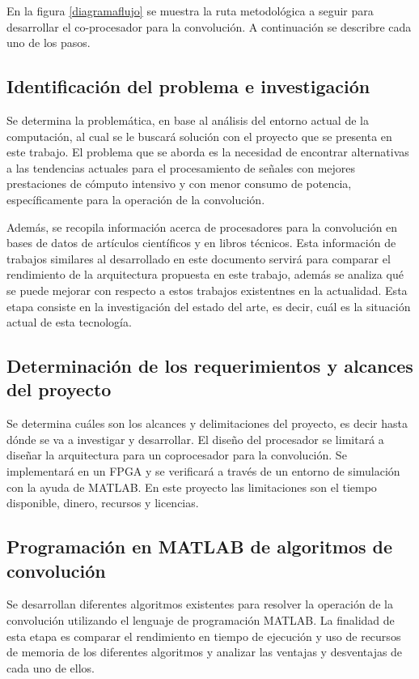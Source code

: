 \newpage
En la figura \ref{diagramaflujo} se muestra la ruta metodológica a seguir para desarrollar el co-procesador para la convolución. A continuación se describre cada uno de los pasos. 

\subsection{Identificación del problema e investigación}
Se determina la problemática, en base al análisis del entorno actual de la computación, al cual se le buscará solución con el proyecto que se presenta en este trabajo. El problema que se aborda es la necesidad de encontrar alternativas a las tendencias actuales para el procesamiento de señales con mejores prestaciones de cómputo intensivo y con menor consumo de potencia, específicamente para la operación de la convolución.

Además, se recopila información acerca de procesadores para la convolución en bases de datos de artículos científicos y en libros técnicos. Esta información de trabajos similares al desarrollado en este documento servirá para comparar el rendimiento de la arquitectura propuesta en este trabajo, además se analiza qué se puede mejorar con respecto a estos trabajos existentnes en la actualidad. Esta etapa consiste en la investigación del estado del arte, es decir, cuál es la situación actual de esta tecnología.

\subsection{Determinación de los requerimientos y alcances del proyecto}
Se determina cuáles son los alcances y delimitaciones del proyecto, es decir hasta dónde se va a investigar y desarrollar. El diseño del procesador se limitará a diseñar  la arquitectura para un coprocesador para la convolución. Se implementará en un FPGA y se verificará a través de un entorno de simulación con la ayuda de MATLAB. En este proyecto las limitaciones son el tiempo disponible, dinero, recursos y licencias.

\subsection{Programación en MATLAB de algoritmos de convolución}
Se desarrollan diferentes algoritmos existentes para resolver la operación de la convolución utilizando el lenguaje de programación MATLAB. La finalidad de esta etapa es comparar el rendimiento en tiempo de ejecución y uso de recursos de memoria de los diferentes algoritmos y analizar las ventajas y desventajas de cada uno de ellos. 

